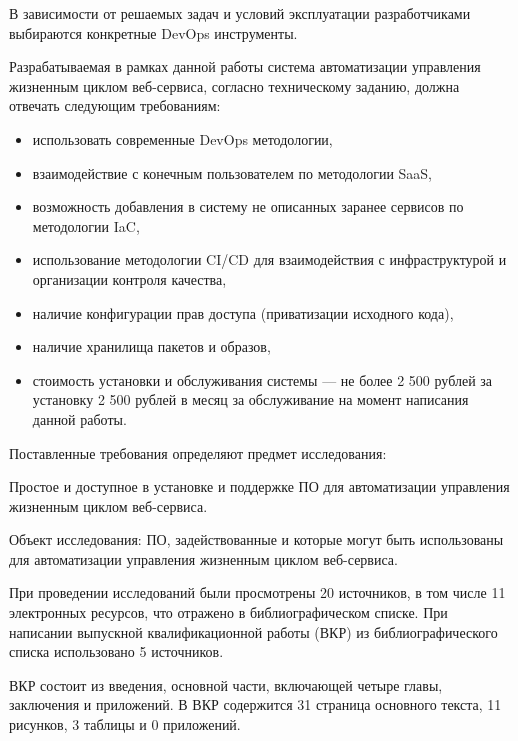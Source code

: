 В зависимости от решаемых задач и условий эксплуатации разработчиками выбираются конкретные DevOps инструменты.

Разрабатываемая в рамках данной работы система автоматизации управления жизненным циклом веб-сервиса,
согласно техническому заданию, должна отвечать следующим требованиям:

\begin{itemize}
    \item использовать современные DevOps методологии,
    \item взаимодействие с конечным пользователем по методологии SaaS,
    \item возможность добавления в систему не описанных заранее сервисов по методологии IaC,
    \item использование методологии CI/CD для взаимодействия с инфраструктурой и организации контроля качества,
    \item наличие конфигурации прав доступа (приватизации исходного кода),
    \item наличие хранилища пакетов и образов,
    \item стоимость установки и обслуживания системы --- не более 2 500 рублей за установку 2 500 рублей в месяц за обслуживание на момент написания данной работы.
\end{itemize}

Поставленные требования определяют предмет исследования:

Простое и доступное в установке и поддержке ПО для автоматизации управления жизненным циклом веб-сервиса\cite{vkrsen}.

Объект исследования: ПО, задействованные и которые могут быть использованы для автоматизации управления жизненным циклом веб-сервиса.

При проведении исследований были просмотрены 20 источников, в том числе 11 электронных ресурсов, что отражено в библиографическом списке.
При написании выпускной квалификационной работы (ВКР) из библиографического списка использовано 5 источников.

ВКР состоит из введения, основной части, включающей четыре главы, заключения и приложений.
В ВКР содержится 31 страница основного текста, 11 рисунков, 3 таблицы и 0 приложений.